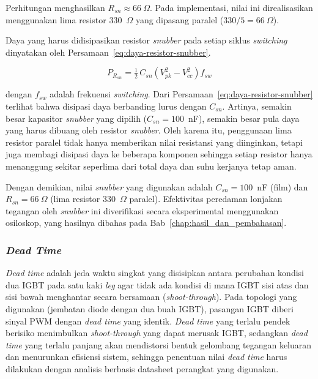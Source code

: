 Perhitungan menghasilkan $R_{sn} \approx 66~\Omega$. Pada implementasi, nilai
ini direalisasikan menggunakan lima resistor 330~$\Omega$ yang
dipasang paralel ($330/5 = 66~\Omega$).

Daya yang harus didisipasikan resistor \emph{snubber} pada setiap siklus
\emph{switching} dinyatakan oleh Persamaan~\ref{eq:daya-resistor-snubber}.

\begin{equation}
  P_{R_{sn}} = \tfrac{1}{2}\, C_{sn} \left( V_{pk}^{2} - V_{cc}^{2} \right) f_{sw}
  \label{eq:daya-resistor-snubber}
\end{equation}

dengan $f_{sw}$ adalah frekuensi \emph{switching}. Dari
Persamaan~\ref{eq:daya-resistor-snubber} terlihat bahwa disipasi daya
berbanding lurus dengan $C_{sn}$. Artinya, semakin besar kapasitor
\emph{snubber} yang dipilih ($C_{sn} = 100$~nF), semakin besar pula
daya yang harus dibuang oleh resistor \emph{snubber}. Oleh karena itu,
penggunaan lima resistor paralel tidak hanya memberikan nilai resistansi
yang diinginkan, tetapi juga membagi disipasi daya ke beberapa komponen
sehingga setiap resistor hanya menanggung sekitar seperlima dari total daya
dan suhu kerjanya tetap aman.

Dengan demikian, nilai \emph{snubber} yang digunakan adalah
$C_{sn} = 100$~nF (film) dan $R_{sn} = 66~\Omega$ (lima resistor
330~$\Omega$ paralel). Efektivitas peredaman lonjakan tegangan oleh
\emph{snubber} ini diverifikasi secara eksperimental menggunakan osiloskop,
yang hasilnya dibahas pada Bab~\ref{chap:hasil_dan_pembahasan}.

\subsubsection{\emph{Dead Time}}
\label{sec:penentuan-dead-time}

\emph{Dead time} adalah jeda waktu singkat yang disisipkan antara
perubahan kondisi dua IGBT pada satu kaki \emph{leg} agar tidak ada
kondisi di mana IGBT sisi atas dan sisi bawah menghantar secara
bersamaan (\emph{shoot-through}). Pada topologi yang digunakan
(jembatan diode dengan dua buah IGBT), pasangan IGBT diberi sinyal
PWM dengan \emph{dead time} yang identik. \emph{Dead time} yang terlalu
pendek berisiko menimbulkan \emph{shoot-through} yang dapat merusak
IGBT, sedangkan \emph{dead time} yang terlalu panjang akan mendistorsi
bentuk gelombang tegangan keluaran dan menurunkan efisiensi sistem,
sehingga penentuan nilai \emph{dead time} harus dilakukan dengan
analisis berbasis datasheet perangkat yang digunakan.

